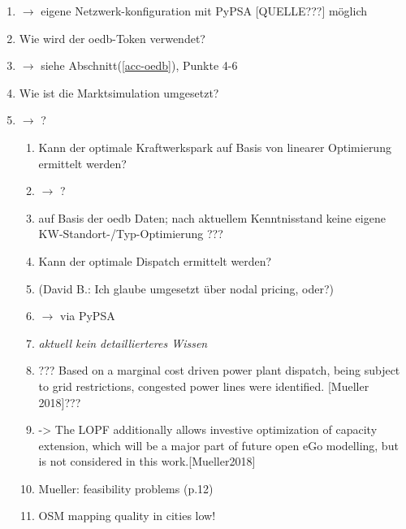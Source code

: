\documentclass[
a4paper,     %
12pt         %
]{scrartcl}  %
\begin{document}
\begin{enumerate}
	\item[] $\rightarrow$ eigene Netzwerk-konfiguration mit PyPSA [QUELLE???] möglich

	\item Wie wird der oedb-Token verwendet?
	\item[] $\rightarrow$ siehe Abschnitt(\ref{acc-oedb}), Punkte 4-6


%


	\item Wie ist die Marktsimulation umgesetzt?
	\item[] $\rightarrow$ ?
	\begin{enumerate}
		\item Kann der optimale Kraftwerkspark auf Basis von linearer Optimierung ermittelt werden?
		\item[]$\rightarrow$ ?

		\item[] auf Basis der oedb Daten; nach aktuellem Kenntnisstand keine eigene KW-Standort-/Typ-Optimierung ???
		
		\item Kann der optimale Dispatch ermittelt werden?
		\item[] (David B.: Ich glaube umgesetzt über nodal pricing, oder?)
		\item[]$\rightarrow$ via PyPSA
		\item[] \textit{aktuell kein detaillierteres Wissen}

		\item[] ??? Based on a marginal cost driven power plant dispatch, being subject to grid restrictions, congested power
		lines were identified. [Mueller 2018]???
		\item[] -> The LOPF additionally allows investive optimization of capacity
		extension, which will be a major part of future open eGo modelling, but is not considered in
		this work.[Mueller2018]
		\item[] Mueller: feasibility problems (p.12)
		\item[] OSM mapping quality in cities low!


\end{enumerate}
\end{enumerate}
\end{document}
